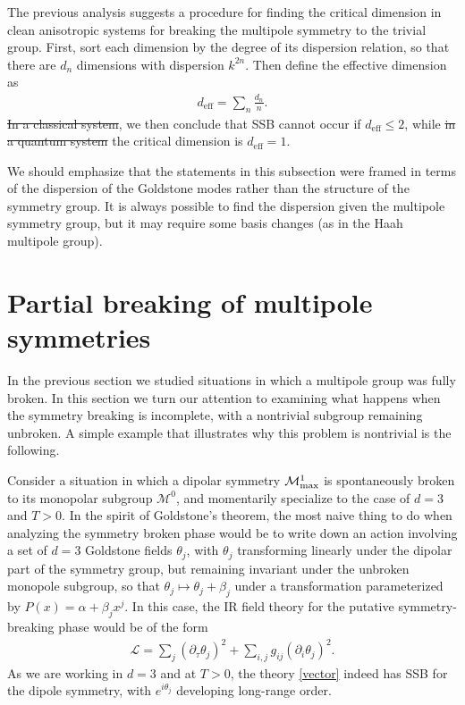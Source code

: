 \documentclass[pra,aps,twocolumn, amsfonts,amsmath,amssymb,nofootinbib,superscriptaddress]{revtex4-2}
\newcommand{\eff}{\text{eff}}
\renewcommand{\t}{\theta}
\newcommand{\mcm}{\mathcal{M}}
\providecommand{\DIFaddtex}[1]{{\protect\color{blue}\uwave{#1}}} %
\providecommand{\DIFdeltex}[1]{{\protect\color{red}\sout{#1}}}                      %
\providecommand{\DIFaddbegin}{} %
\providecommand{\DIFaddend}{} %
\providecommand{\DIFdelbegin}{} %
\providecommand{\DIFdelend}{} %
\providecommand{\DIFadd}[1]{\texorpdfstring{\DIFaddtex{#1}}{#1}} %
\providecommand{\DIFdel}[1]{\texorpdfstring{\DIFdeltex{#1}}{}} %
\newcommand{\DIFscaledelfig}{0.5}
\newlength{\DIFdelgraphicswidth} %
\newlength{\DIFdelgraphicsheight} %
\newcommand{\DIFaddincludegraphics}[2][]{{\color{blue}\fbox{\DIFOincludegraphics[#1]{#2}}}} %
\newcommand{\DIFdelincludegraphics}[2][]{%
\sbox{\DIFdelgraphicsbox}{\DIFOincludegraphics[#1]{#2}}%
\settoboxwidth{\DIFdelgraphicswidth}{\DIFdelgraphicsbox} %
\settoboxtotalheight{\DIFdelgraphicsheight}{\DIFdelgraphicsbox} %
\scalebox{\DIFscaledelfig}{%
\parbox[b]{\DIFdelgraphicswidth}{\usebox{\DIFdelgraphicsbox}\\[-\baselineskip] \rule{\DIFdelgraphicswidth}{0em}}\llap{\resizebox{\DIFdelgraphicswidth}{\DIFdelgraphicsheight}{%
\setlength{\unitlength}{\DIFdelgraphicswidth}%
\begin{picture}(1,1)%
\thicklines\linethickness{2pt} %
{\color[rgb]{1,0,0}\put(0,0){\framebox(1,1){}}}%
{\color[rgb]{1,0,0}\put(0,0){\line( 1,1){1}}}%
{\color[rgb]{1,0,0}\put(0,1){\line(1,-1){1}}}%
\end{picture}%
}\hspace*{3pt}}} %
} %
\DeclareRobustCommand{\DIFaddbegin}{\DIFOaddbegin \let\includegraphics\DIFaddincludegraphics} %
\DeclareRobustCommand{\DIFaddend}{\DIFOaddend \let\includegraphics\DIFOincludegraphics} %
\DeclareRobustCommand{\DIFdelbegin}{\DIFOdelbegin \let\includegraphics\DIFdelincludegraphics} %
\DeclareRobustCommand{\DIFdelend}{\DIFOaddend \let\includegraphics\DIFOincludegraphics} %
\begin{document}
The previous analysis suggests a procedure for finding the critical dimension in clean anisotropic systems for breaking the multipole symmetry to the trivial group. First, sort each dimension by the degree of its dispersion relation, so that there are $d_n$ dimensions with dispersion $k^{2n}$. Then define the effective dimension as 
\begin{align}
d_\eff = \sum_n \frac{d_n}{n}.
\end{align}
\DIFdelbegin \DIFdel{In a classical system}\DIFdelend \DIFaddbegin \DIFadd{For $T>0$}\DIFaddend , we then conclude that SSB cannot occur if $d_\eff\le 2$, while \DIFdelbegin \DIFdel{in a quantum system }\DIFdelend \DIFaddbegin \DIFadd{at $T=0$ }\DIFaddend the critical dimension is $d_\eff = 1$.

We should emphasize that the statements in this subsection were framed in terms of the dispersion of the Goldstone modes rather than the structure of the symmetry group. It is always possible to find the dispersion given the multipole symmetry group, but it may require some basis changes (as in the Haah multipole group).

\section{Partial breaking of multipole symmetries} \label{sec:partial}

In the previous section we studied situations in which a multipole group was fully broken. In this section we turn our attention to examining what happens when the symmetry breaking is incomplete, with a nontrivial subgroup remaining unbroken. A simple example that illustrates why this problem is nontrivial is the following. 

Consider a situation in which a dipolar symmetry $\mcm^1_{\rm max}$ is spontaneously broken to its monopolar subgroup $\mcm^0$, and momentarily specialize to the case of $d=3$ and $T>0$. In the spirit of Goldstone's theorem, the most naive thing to do when analyzing the symmetry broken phase would be to write down an action involving a set of $d=3$ Goldstone fields $\theta_j$, with $\t_j$ transforming linearly under the dipolar part of the symmetry group, but remaining invariant under the unbroken monopole subgroup, so that $\theta_j \mapsto \theta_j + \beta_j$ under a transformation parameterized by $P(x) = \alpha + \beta_j x^j$. In this case, the IR field theory for the putative symmetry-breaking phase would be of the form 
\begin{align}
\label{vector} \mathcal{L}= \sum_j  (\partial_\tau \theta_j)^2 + \sum_{i,j} g_{ij} (\partial_i \theta_j)^2.
\end{align}
As we are working in $d=3$ and at $T>0$, the theory \eqref{vector} indeed has SSB for the dipole symmetry, with $e^{i\t_j}$ developing long-range order. 
\end{document}
